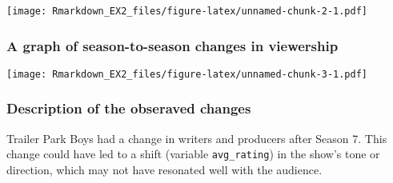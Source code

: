 \documentclass[
]{article}
\begin{document}
\texttt{[image: Rmarkdown\_EX2\_files/figure-latex/unnamed-chunk-2-1.pdf]}

\hypertarget{a-graph-of-season-to-season-changes-in-viewership}{%
\subsubsection{A graph of season-to-season changes in
viewership}\label{a-graph-of-season-to-season-changes-in-viewership}}

\texttt{[image: Rmarkdown\_EX2\_files/figure-latex/unnamed-chunk-3-1.pdf]}

\hypertarget{description-of-the-obseraved-changes}{%
\subsubsection{Description of the obseraved
changes}\label{description-of-the-obseraved-changes}}

Trailer Park Boys had a change in writers and producers after Season 7.
This change could have led to a shift (variable \texttt{avg\_rating}) in
the show's tone or direction, which may not have resonated well with the
audience.
\end{document}
